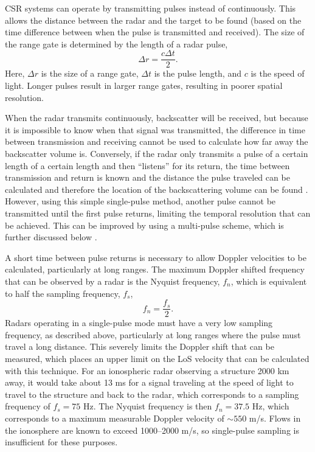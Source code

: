 CSR systems can operate by transmitting pulses instead of continuously.  This allows the distance between the radar and the target to be found (based on the time difference between when the pulse is transmitted and received).  The size of the range gate is determined by the length of a radar pulse,
\begin{equation}
	\label{eqn:range_gate}
	\Delta r = \frac{c\Delta t}{2}.
\end{equation}
Here, \(\Delta r\) is the size of a range gate, \(\Delta t\) is the pulse length, and \(c\) is the speed of light.  Longer pulses result in larger range gates, resulting in poorer spatial resolution.

When the radar transmits continuously, backscatter will be received, but because it is impossible to know when that signal was transmitted, the difference in time between transmission and receiving cannot be used to calculate how far away the backscatter volume is.  Conversely, if the radar only transmits a pulse of a certain length of a certain length and then ``listens'' for its return, the time between transmission and return is known and the distance the pulse traveled can be calculated and therefore the location of the backscattering volume can be found \citep{Farley1972,Greenwald1983}.  However, using this simple single-pulse method, another pulse cannot be transmitted until the first pulse returns, limiting the temporal resolution that can be achieved.  This can be improved by using a multi-pulse scheme, which is further discussed below \citep{Farley1972,Greenwald1983,Greenwald1985}.

A short time between pulse returns is necessary to allow Doppler velocities to be calculated, particularly at long ranges.  The maximum Doppler shifted frequency that can be observed by a radar is the Nyquist frequency, \(f_n\), which is equivalent to half the sampling frequency, \(f_s\),
\begin{equation}	
	\label{eqn:nyquist}
	f_n = \frac{f_s}{2}.
\end{equation}
Radars operating in a single-pulse mode must have a very low sampling frequency, as described above, particularly at long ranges where the pulse must travel a long distance.  This severely limits the Doppler shift that can be measured, which places an upper limit on the LoS velocity that can be calculated with this technique.  For an ionospheric radar observing a structure 2000 km away, it would take about 13 ms for a signal traveling at the speed of light to travel to the structure and back to the radar, which corresponds to a sampling frequency of \(f_s = 75\) Hz.  The Nyquist frequency is then \(f_n = 37.5\) Hz, which corresponds to a maximum measurable Doppler velocity of \(\sim550\) m/s.  Flows in the ionosphere are known to exceed 1000--2000 m/s, so single-pulse sampling is insufficient for these purposes.


